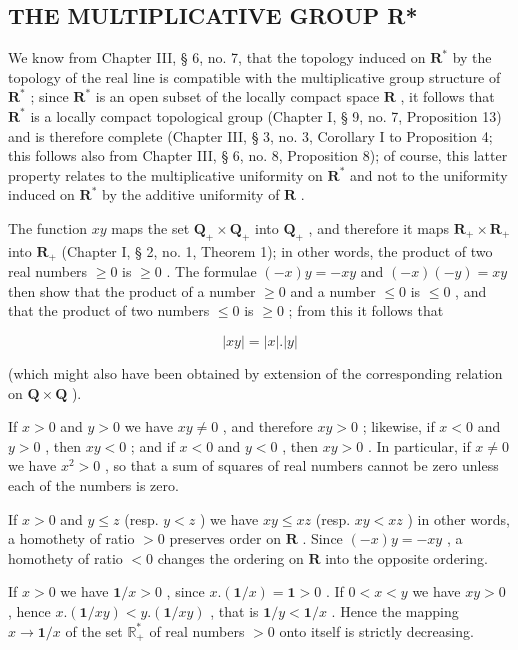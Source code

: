 \subsection{THE MULTIPLICATIVE GROUP R*}

We know from Chapter III, § 6, no. 7, that the topology induced on \(\mathbf{R}^*\) by the topology of the real line is compatible with the multiplicative group structure of \(\mathbf{R}^*\) ; since \(\mathbf{R}^*\) is an open subset of the locally compact space \(\mathbf{R}\) , it follows that \(\mathbf{R}^*\) is a locally compact topological group (Chapter I, § 9, no. 7, Proposition 13) and is therefore complete (Chapter III, § 3, no. 3, Corollary I to Proposition 4; this follows also from Chapter III, § 6, no. 8, Proposition 8); of course, this latter property relates to the multiplicative uniformity on \(\mathbf{R}^*\) and not to the uniformity induced on \(\mathbf{R}^*\) by the additive uniformity of \(\mathbf{R}\) .

The function \(xy\) maps the set \(\mathbf{Q}_{+} \times \mathbf{Q}_{+}\) into \(\mathbf{Q}_{+}\) , and therefore it maps \(\mathbf{R}_{+} \times \mathbf{R}_{+}\) into \(\mathbf{R}_{+}\) (Chapter I, § 2, no. 1, Theorem 1); in other words, the product of two real numbers \(\geqslant 0\) is \(\geqslant 0\) . The formulae \((-x)y = -xy\) and \((-x)(-y) = xy\) then show that the product of a number \(\geqslant 0\) and a number \(\leqslant 0\) is \(\leqslant 0\) , and that the product of two numbers \(\leqslant 0\) is \(\geqslant 0\) ; from this it follows that

\[
| x y | = | x |. | y |\tag{1}
\]

(which might also have been obtained by extension of the corresponding relation on \(\mathbf{Q} \times \mathbf{Q}\) ).

If \(x > 0\) and \(y > 0\) we have \(xy \neq 0\) , and therefore \(xy > 0\) ; likewise, if \(x < 0\) and \(y > 0\) , then \(xy < 0\) ; and if \(x < 0\) and \(y < 0\) , then \(xy > 0\) . In particular, if \(x \neq 0\) we have \(x^2 > 0\) , so that a sum of squares of real numbers cannot be zero unless each of the numbers is zero.

If \(x > 0\) and \(y \leqslant z\) (resp. \(y < z\) ) we have \(xy \leqslant xz\) (resp. \(xy < xz\) ) in other words, a homothety of ratio \(> 0\) preserves order on \(\mathbf{R}\) . Since \((-x)y = -xy\) , a homothety of ratio \(< 0\) changes the ordering on \(\mathbf{R}\) into the opposite ordering.

If \(x > 0\) we have \(\mathbf{1} / x > 0\) , since \(x.(\mathbf{1} / x) = \mathbf{1} > 0\) . If \(0 < x < y\) we have \(xy > 0\) , hence \(x.(\mathbf{1} / xy) < y.(\mathbf{1} / xy)\) , that is \(\mathbf{1} / y < \mathbf{1} / x\) . Hence the mapping \(x \to \mathbf{1} / x\) of the set \(\mathbb{R}_+^*\) of real numbers \(> 0\) onto itself is strictly decreasing.

